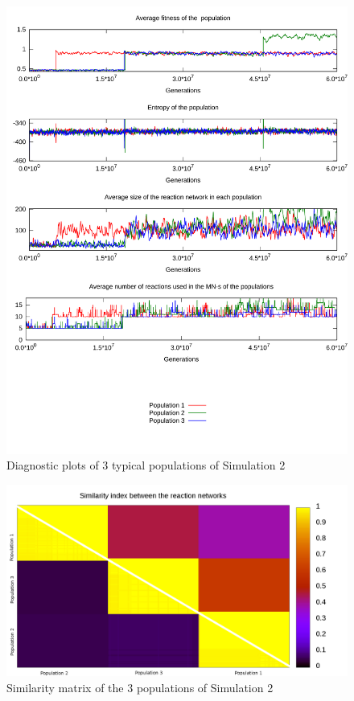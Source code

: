 \documentclass[a4paper,12pt]{article}
\begin{document}
\begin{figure}[htpb]
	\centering
	\includegraphics[width=0.8\linewidth]{simulation2.pdf}
	\caption{Diagnostic plots of 3 typical populations of Simulation 2}
	\label{fig:simulation2}
\end{figure}

\begin{figure}[htpb]
	\centering
	\includegraphics[width=1\linewidth]{simmatrix_sim2.png}
	\caption{Similarity matrix of the $3$ populations of Simulation 2}
	\label{fig:simmatrix_sim2}
\end{figure}
\end{document}
